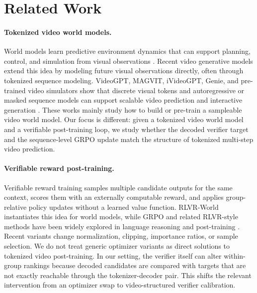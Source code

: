 \documentclass[letterpaper]{article} %
\begin{document}
\section{Related Work}

\paragraph{Tokenized video world models.}
World models learn predictive environment dynamics that can support planning, control, and simulation from visual observations \citep{worldmodels,rssm,dreamerv2,dreamerv3}. Recent video generative models extend this idea by modeling future visual observations directly, often through tokenized sequence modeling. VideoGPT, MAGVIT, iVideoGPT, Genie, and pre-trained video simulators show that discrete visual tokens and autoregressive or masked sequence models can support scalable video prediction and interactive generation \citep{videogpt,magvit,ivideogpt,genie,dws}. These works mainly study how to build or pre-train a sampleable video world model. Our focus is different: given a tokenized video world model and a verifiable post-training loop, we study whether the decoded verifier target and the sequence-level GRPO update match the structure of tokenized multi-step video prediction.

\paragraph{Verifiable reward post-training.}
Verifiable reward training samples multiple candidate outputs for the same context, scores them with an externally computable reward, and applies group-relative policy updates without a learned value function. RLVR-World instantiates this idea for world models, while GRPO and related RLVR-style methods have been widely explored in language reasoning and post-training \citep{rlvrworld,grpo,deepseekr1}. Recent variants change normalization, clipping, importance ratios, or sample selection. We do not treat generic optimizer variants as direct solutions to tokenized video post-training. In our setting, the verifier itself can alter within-group rankings because decoded candidates are compared with targets that are not exactly reachable through the tokenizer-decoder pair. This shifts the relevant intervention from an optimizer swap to video-structured verifier calibration.
\end{document}
